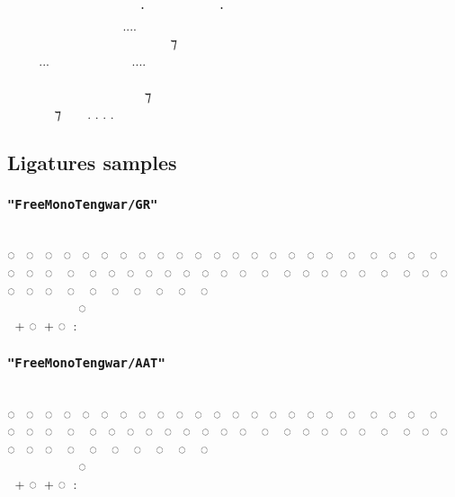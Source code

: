 \documentclass[11pt,a4paper]{article}
\begin{document}
\freeICU
  ‍   ⸱‍  ‍ ⸱ \\
    ‍....  ‍  \\
  ‍   ‍ ‍ ⁊ ‍  \\
...  ....   \\
         ‍ \\
 ‍ ‍‍   ⁊  ‍ ‍ \\
 ‍ ⁊  . . . . \normalfont


\newpage

\subsection{Ligatures samples}

\subsubsection*{\texttt{"FreeMonoTengwar/GR"}}

\freeGR
                          \\
◌ ◌ ◌ ◌ ◌ ◌ ◌ ◌ ◌ ◌ ◌ ◌ ◌ ◌ ◌ ◌ ◌ ◌ ◌ ◌ ◌ ◌ ◌ ◌ ◌ ◌ ◌ ◌ ◌ ◌ ◌ ◌ ◌ ◌ ◌ ◌ ◌ ◌ ◌ ◌ ◌ ◌ ◌ ◌ ◌ ◌ ◌ ◌ ◌ ◌ ◌ ◌ ◌ ◌ ◌ ◌\\
      ◌‍ ‍ ‍ ‍ \\
 \normalfont + \freeGR ◌ \normalfont + \freeGR ◌ : 

\subsubsection*{\texttt{"FreeMonoTengwar/AAT"}}

\freeAAT
                          \\
◌ ◌ ◌ ◌ ◌ ◌ ◌ ◌ ◌ ◌ ◌ ◌ ◌ ◌ ◌ ◌ ◌ ◌ ◌ ◌ ◌ ◌ ◌ ◌ ◌ ◌ ◌ ◌ ◌ ◌ ◌ ◌ ◌ ◌ ◌ ◌ ◌ ◌ ◌ ◌ ◌ ◌ ◌ ◌ ◌ ◌ ◌ ◌ ◌ ◌ ◌ ◌ ◌ ◌ ◌ ◌\\
      ◌‍ ‍ ‍ ‍ \\
 \normalfont + \freeAAT ◌ \normalfont + \freeAAT ◌ : 
\end{document}

